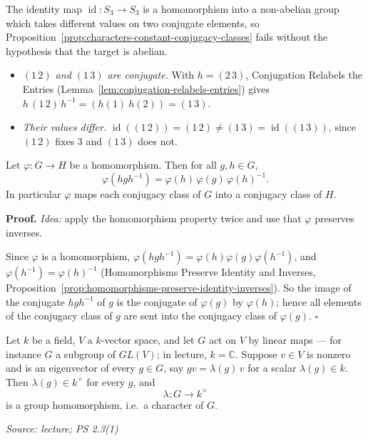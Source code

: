 \documentclass[11pt]{report}
\renewenvironment{proof}[1][Proof]{\noindent\textbf{#1.} }{\hfill$\square$\par\vspace{5pt}}
\newcommand{\srcline}[1]{\par\hfill{\footnotesize\textit{Source: #1}}}
\begin{document}
\begin{exbox}\label{ex:identity-s3-separates-conjugates}
The identity map $\operatorname{id}: S_3 \to S_3$ is a homomorphism into a non-abelian group which takes different values on two conjugate elements, so Proposition~\ref{prop:characters-constant-conjugacy-classes} fails without the hypothesis that the target is abelian.
\begin{itemize}[nosep]
    \item \emph{$(1\,2)$ and $(1\,3)$ are conjugate.} With $h = (2\,3)$, Conjugation Relabels the Entries (Lemma~\ref{lem:conjugation-relabels-entries}) gives $h\,(1\,2)\,h^{-1} = (h(1)\ h(2)) = (1\,3)$.
    \item \emph{Their values differ.} $\operatorname{id}((1\,2)) = (1\,2) \neq (1\,3) = \operatorname{id}((1\,3))$, since $(1\,2)$ fixes $3$ and $(1\,3)$ does not.
\end{itemize}
\end{exbox}

\begin{lembox}\label{lem:homomorphisms-carry-conjugates}
Let $\varphi: G \to H$ be a homomorphism. Then for all $g, h \in G$,
\[ \varphi(hgh^{-1}) = \varphi(h)\,\varphi(g)\,\varphi(h)^{-1}. \]
In particular $\varphi$ maps each conjugacy class of $G$ into a conjugacy class of $H$.
\end{lembox}

\begin{proof}
\textit{Idea:} apply the homomorphism property twice and use that $\varphi$ preserves inverses.\par
Since $\varphi$ is a homomorphism, $\varphi(hgh^{-1}) = \varphi(h)\varphi(g)\varphi(h^{-1})$, and $\varphi(h^{-1}) = \varphi(h)^{-1}$ (Homomorphisms Preserve Identity and Inverses, Proposition~\ref{prop:homomorphisms-preserve-identity-inverses}). So the image of the conjugate $hgh^{-1}$ of $g$ is the conjugate of $\varphi(g)$ by $\varphi(h)$; hence all elements of the conjugacy class of $g$ are sent into the conjugacy class of $\varphi(g)$.
\end{proof}

\begin{thmbox}\label{thm:common-eigenvector-yields-character}
Let $k$ be a field, $V$ a $k$-vector space, and let $G$ act on $V$ by linear maps --- for instance $G$ a subgroup of $GL(V)$; in lecture, $k = \mathbb{C}$. Suppose $v \in V$ is nonzero and is an eigenvector of every $g \in G$, say $g v = \lambda(g)\,v$ for a scalar $\lambda(g) \in k$. Then $\lambda(g) \in k^\times$ for every $g$, and
\[ \lambda: G \to k^\times \]
is a group homomorphism, i.e.\ a character of $G$.
\srcline{lecture; PS 2.3(1)}
\end{thmbox}
\end{document}
